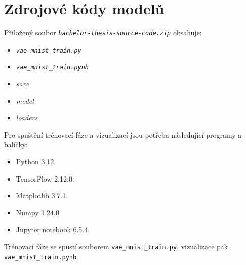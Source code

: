 \chapter{Zdrojové kódy modelů}
\label{app:vae_model_source_code}

Přiložený soubor \emph{\lstinline|bachelor-thesis-source-code.zip|} obsahuje:

\begin{itemize}
    \item \emph{\lstinline|vae_mnist_train.py|}
    \item \emph{\lstinline|vae_mnist_train.pynb|}
    \item \emph{save}
    \item \emph{model}
    \item \emph{loaders}
\end{itemize}

Pro spuštění trénovací fáze a vizualizací jsou potřeba následující programy a balíčky:
\begin{itemize}
    \item Python 3.12.
    \item TensorFlow 2.12.0.
    \item Matplotlib 3.7.1.
    \item Numpy 1.24.0
    \item Jupyter notebook 6.5.4.
\end{itemize}

Trénovací fáze se spustí souborem \lstinline|vae_mnist_train.py|, vizualizace pak \lstinline|vae_mnist_train.pynb|.